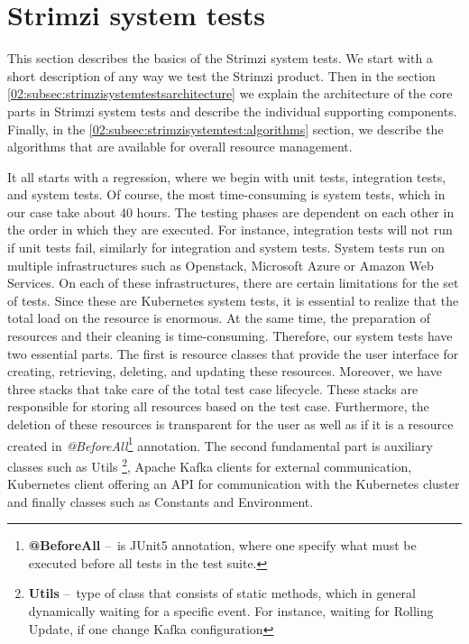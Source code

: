 \section{Strimzi system tests}
\label{02:sec:strimzisystemtests}

This section describes the basics of the Strimzi system tests.
We start with a short description of any way we test the Strimzi product.
Then in the section \ref{02:subsec:strimzisystemtestsarchitecture} we explain the architecture of the core parts in Strimzi system tests and describe the individual supporting components. Finally, in the \ref{02:subsec:strimzisystemtest:algorithms} section, we describe the algorithms that are available for overall resource management.

It all starts with a regression, where we begin with unit tests, integration tests, and system tests. Of course, the most time-consuming is system tests, which in our case take about 40 hours. The testing phases are dependent on each other in the order in which they are executed. For instance, integration tests will not run if unit tests fail, similarly for integration and system tests. System tests run on multiple infrastructures such as Openstack, Microsoft Azure or Amazon Web Services. On each of these infrastructures, there are certain limitations for the set of tests. Since these are Kubernetes system tests, it is essential to realize that the total load on the resource is enormous. At the same time, the preparation of resources and their cleaning is time-consuming. Therefore, our system tests have two essential parts. The first is resource classes that provide the user interface for creating, retrieving, deleting, and updating these resources.
Moreover, we have three stacks that take care of the total test case lifecycle. These stacks are responsible for storing all resources based on the test case. Furthermore, the deletion of these resources is transparent for the user as well as if it is a resource created in \emph{@BeforeAll}\footnote{\textbf{@BeforeAll } \---\ is JUnit5 annotation, where one specify what must be executed before all tests in the test suite.} annotation. The second fundamental part is auxiliary classes such as Utils \footnote {\textbf{Utils} \---\ type of class that consists of static methods, which in general dynamically waiting for a specific event. For instance, waiting for Rolling Update, if one change Kafka configuration}, Apache Kafka clients for external communication, Kubernetes client offering an API for communication with the Kubernetes cluster and finally classes such as Constants and Environment.

